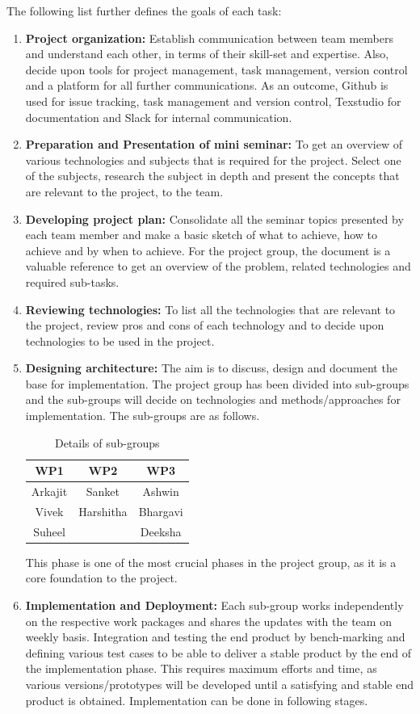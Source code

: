 The following list further defines the goals of each task: 
\begin{enumerate}
	\item \textbf{Project organization:}
	Establish communication between team members and understand each other, in terms of their skill-set and expertise. Also, decide upon tools for project management, task management, version control and a platform for all further communications. As an outcome, Github is used for issue tracking, task management and version control, Texstudio for documentation and Slack for internal communication.
	\item \textbf{Preparation and Presentation of mini seminar:}
	To get an overview of various technologies and subjects that is required for the project. Select one of the subjects, research the subject in depth and present the concepts that are relevant to the project, to the team.
	\item \textbf{Developing project plan:}
	Consolidate all the seminar topics presented by each team member and make a basic sketch of what to achieve, how to achieve and by when to achieve. For the project group, the document is a valuable reference to get an overview of the problem, related technologies and required sub-tasks. 
	\item \textbf{Reviewing technologies:}
	To list all the technologies that are relevant to the project, review pros and cons of each technology and to decide upon technologies to be used in the project.
	\item \textbf{Designing architecture:}
 The aim is to discuss, design and document the base for implementation. The project group has been divided into sub-groups and the sub-groups will decide on technologies and methods/approaches for implementation. The sub-groups are as follows.
 
\begin{table} [h]
	\centering
	\begin{tabular}{|c|c|c|}
		\hline
		WP1 & WP2 & WP3 \\
		\hline
		Arkajit & Sanket & Ashwin \\
		\hline
		Vivek &	Harshitha & Bhargavi \\
		\hline
		Suheel &  & Deeksha \\
		\hline
	\end{tabular}
	\caption{Details of sub-groups}
\end{table}
	
	This phase is one of the most crucial phases in the project group, as it is a core foundation to the project.
	\item \textbf{Implementation and Deployment:}
	 Each sub-group works independently on the respective work packages and shares the updates with the team on weekly basis. Integration and testing the end product by bench-marking and defining various test cases to be able to deliver a stable product by the end of the implementation phase. This requires maximum efforts and time, as various versions/prototypes will be developed until a satisfying and stable end product is obtained. Implementation can be done in following stages.
	

\end{enumerate}

